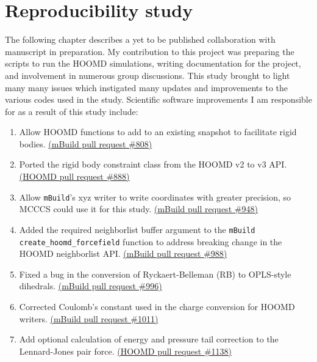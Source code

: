 \chapter{Reproducibility study}
\label{chap:reproducibility}

The following chapter describes a yet to be published collaboration with manuscript in preparation.
My contribution to this project was preparing the scripts to run the HOOMD simulations, writing documentation for the project, and involvement in numerous group discussions. 
This study brought to light many many issues which instigated many updates and improvements to the various codes used in the study.
Scientific software improvements I am responsible for as a result of this study include:
\begin{enumerate}
    \item Allow HOOMD functions to add to an existing snapshot to facilitate rigid bodies. \href{https://github.com/mosdef-hub/mbuild/pull/808}{(mBuild pull request \#808)}
    \item Ported the rigid body constraint class from the HOOMD v2 to v3 API. \href{https://github.com/glotzerlab/hoomd-blue/pull/888}{(HOOMD pull request \#888)}
    \item Allow \texttt{mBuild}'s xyz writer to write coordinates with greater precision, so MCCCS could use it for this study. \href{https://github.com/mosdef-hub/mbuild/pull/996}{(mBuild pull request \#948)}
    \item Added the required neighborlist buffer argument to the \texttt{mBuild} \lstinline{create_hoomd_forcefield} function to address breaking change in the HOOMD neighborlist API. \href{https://github.com/mosdef-hub/mbuild/pull/988}{(mBuild pull request \#988)}
    \item Fixed a bug in the conversion of Ryckaert-Belleman (RB) to OPLS-style dihedrals. \href{https://github.com/mosdef-hub/mbuild/pull/996}{(mBuild pull request \#996)}
    \item Corrected Coulomb's constant used in the charge conversion for HOOMD writers. \href{https://github.com/mosdef-hub/mbuild/pull/1011}{(mBuild pull request \#1011)}
    \item Add optional calculation of energy and pressure tail correction to the Lennard-Jones pair force. \href{https://github.com/glotzerlab/hoomd-blue/pull/1138}{(HOOMD pull request \#1138)}
\end{enumerate}

